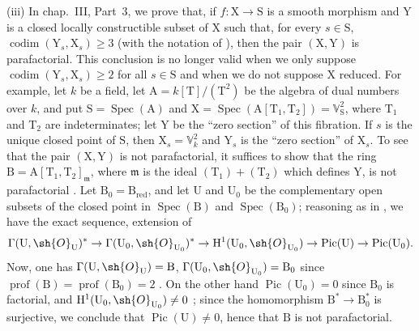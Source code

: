 \begin{env}[21.14.4]
(iii) In chap.~III, Part~3, we prove that, if $f:\mathrm{X}\to\mathrm{S}$ is a smooth morphism and $\mathrm{Y}$ is a closed locally constructible subset of $\mathrm{X}$ such that, for every $s\in\mathrm{S}$, $\operatorname{codim}(\mathrm{Y}_s,\mathrm{X}_s)\geq3$ (with the notation of ), then the pair $(\mathrm{X},\mathrm{Y})$ is parafactorial.
This conclusion is no longer valid when we only suppose $\operatorname{codim}(\mathrm{Y}_s,\mathrm{X}_s)\geq 2$ for all $s\in\mathrm{S}$ and when we do not suppose $\mathrm{X}$ reduced.
For example, let $k$ be a field, let $\mathrm{A}=k[\mathrm{T}]/(\mathrm{T}^2)$ be the algebra of dual numbers over $k$, and put $\mathrm{S}=\operatorname{Spec}(\mathrm{A})$ and $\mathrm{X}=\operatorname{Spec}(\mathrm{A}[\mathrm{T}_1,\mathrm{T}_2])=\mathbb{V}_{\mathrm{S}}^2$, where $\mathrm{T}_1$ and $\mathrm{T}_2$ are indeterminates; let $\mathrm{Y}$ be the ``zero section'' of this fibration. If $s$ is the unique closed point of $\mathrm{S}$, then $\mathrm{X}_s=\mathbb{V}_k^2$ and $\mathrm{Y}_s$ is the ``zero section'' of $\mathrm{X}_s$.
To see that the pair $(\mathrm{X},\mathrm{Y})$ is not parafactorial, it suffices to show that the ring $\mathrm{B}=\mathrm{A}[\mathrm{T}_1,\mathrm{T}_2]_\mathfrak{m}$, where $\mathfrak{m}$ is the ideal $(\mathrm{T}_1)+(\mathrm{T}_2)$ which defines $\mathrm{Y}$, is not parafactorial .
Let $\mathrm{B}_0=\mathrm{B}_{\mathrm{red}}$, and let $\mathrm{U}$ and $\mathrm{U}_0$ be the complementary open subsets of the closed point in $\operatorname{Spec}(\mathrm{B})$ and $\operatorname{Spec}(\mathrm{B}_0)$; reasoning as in , we have the exact sequence, extension of 
\[
  \Gamma(\mathrm{U},\sh{O}_{\mathrm{U}})^*\to\Gamma(\mathrm{U}_0,\sh{O}_{\mathrm{U}_0})^*\to\mathrm{H}^1(\mathrm{U}_0,\sh{O}_{\mathrm{U}_0})\to\operatorname{Pic}(\mathrm{U})\to\operatorname{Pic}(\mathrm{U}_0).
\]
Now, one has $\Gamma(\mathrm{U},\sh{O}_{\mathrm{U}})=\mathrm{B}$, $\Gamma(\mathrm{U}_0,\sh{O}_{\mathrm{U}_0})=\mathrm{B}_0$ since $\operatorname{prof}(\mathrm{B})=\operatorname{prof}(\mathrm{B}_0)=2$ .
On the other hand $\operatorname{Pic}(\mathrm{U}_0)=0$ since $\mathrm{B}_0$ is factorial, and $\mathrm{H}^1(\mathrm{U}_0,\sh{O}_{\mathrm{U}_0})\neq 0$ \cite[3, Example~III-1]{IV-41}; since the homomorphism $\mathrm{B}^*\to\mathrm{B}_0^*$ is surjective, we conclude that $\operatorname{Pic}(\mathrm{U})\neq 0$, hence that $\mathrm{B}$ is not parafactorial.
\end{env}

